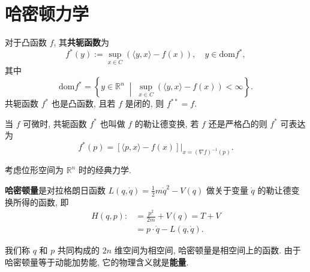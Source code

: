 \section{哈密顿力学}

对于凸函数 $ f $, 其{\bf 共轭函数}为
\[ f^*(y):=\sup_{x\in C}(\langle y,x \rangle-f(x)),\quad y\in \mathrm{dom}f^*, \]
其中 
\[ \mathrm{dom}f^*=\left\{ y\in\mathbb{R}^n \;\middle|\; \sup_{x\in C}(\langle y,x \rangle-f(x))<\infty \right\}. \]
共轭函数 $ f^* $ 也是凸函数, 且若 $ f $ 是闭的, 则 $ f^{**}=f $. 

当 $ f $ 可微时, 共轭函数 $ f^* $ 也叫做 $ f $ 的勒让德变换, 若 $ f $ 还是严格凸的则 $ f^* $ 可表达为
\[ f^*(p)=\left[\langle p,x \rangle-f(x)\right]\big|_{x=(\nabla f)^{-1}(p)}.\]

考虑位形空间为 $ \mathbb{R}^n $ 时的经典力学.

\begin{definition}[哈密顿量]
{\bf 哈密顿量}是对拉格朗日函数 $ L(q,\dot{q})=\frac{1}{2}m\dot{q}^2-V(q) $ 做关于变量 $ \dot{q} $ 的勒让德变换所得的函数, 即
\begin{align*}
    H(q,p) :&= \frac{p^2}{2m}+V(q)=T+V\\ 
    &= p\cdot\dot{q}-L(q,\dot{q}).
\end{align*}
\end{definition}

我们称 $ q $ 和 $ p $ 共同构成的 $ 2n $ 维空间为相空间, 哈密顿量是相空间上的函数. 由于哈密顿量等于动能加势能, 它的物理含义就是{\bf 能量}. 


